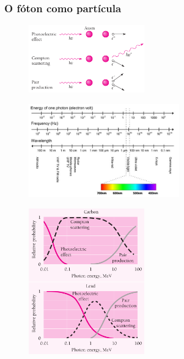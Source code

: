 \documentclass[12pt,brazil]{beamer}
\begin{document}

\begin{frame}
  \frametitle{O fóton como partícula}
  

  \begin{multicols}{2}
    \begin{minipage}[b][20ex][t]{\linewidth}
    \vspace*{0.25cm}
      \begin{figure}
        \includegraphics[width=5.0cm]{figuras/fig24}
      \end{figure}
    \end{minipage}

    \begin{minipage}[b][20ex][t]{\linewidth}    
    \vspace*{-1cm}
      \begin{figure}
        \includegraphics[width=6.5cm]{figuras/fig26}
      \end{figure}
      \fontsize{8pt}{11pt}\selectfont
      
    \end{minipage}

    \begin{minipage}[b][40ex][t]{\linewidth}    
    \vspace*{0.5cm}
      \begin{figure}
        \hspace*{.5cm}\includegraphics[width=5cm]{figuras/fig25}
      \end{figure}
      
    \end{minipage}
  \end{multicols} 
  
\end{frame}
\end{document}

